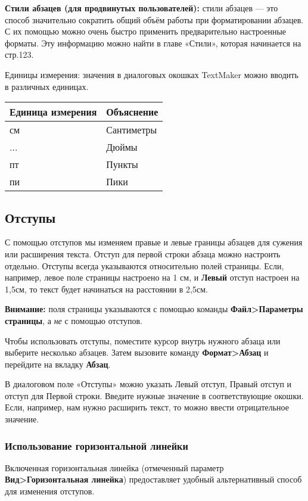 \documentclass[a4paper,10pt]{article}
\begin{document}
\textbf{Стили абзацев (для продвинутых пользователей):} стили абзацев --- это способ значительно сократить общий объём работы при форматировании абзацев. С их помощью можно очень быстро применить предварительно настроенные форматы. Эту информацию можно найти в главе «Стили», которая начинается на стр.123.

Единицы измерения: значения в диалоговых окошках TextMaker можно вводить в различных единицах.

\begin{center}
\begin{tabular}{ | m{4cm} | m{4cm} | }
\hline
 \textbf{Единица измерения} & \textbf{Объяснение} \\ 
 \hline
 см & Сантиметры\\
\hline
... & Дюймы\\
\hline
пт & Пункты \\
\hline
пи & Пики\\
\hline
\end{tabular}
\end{center}

\subsection{Отступы}
С помощью отступов мы изменяем правые и левые границы абзацев для сужения или расширения текста. Отступ для первой строки абзаца можно настроить отдельно.
Отступы всегда указываются относительно полей страницы. Если, например, левое поле страницы настроено на 1 см, и \textbf{Левый} отступ настроен на 1,5см, то текст будет начинаться на расстоянии в 2,5см.

\begin{mdframed}[backgroundcolor=blue!10]
\textbf{Внимание:} поля страницы указываются с помощью команды \textbf{Файл>Параметры страницы}, а \textit{не} с помощью отступов.
\end{mdframed}

Чтобы использовать отступы, поместите курсор внутрь нужного абзаца или выберите несколько абзацев. Затем вызовите команду \textbf{Формат>Абзац} и перейдите на вкладку \textbf{Абзац}.

В диалоговом поле «Отступы»  можно указать Левый отступ, Правый отступ и отступ для Первой строки. Введите нужные значение в соответствующие окошки.
Если, например, нам нужно расширить текст, то можно ввести отрицательное значение.

\subsubsection{Использование горизонтальной линейки}
Включенная горизонтальная линейка (отмеченный параметр \textbf{Вид>Горизонтальная линейка}) предоставляет удобный альтернативный способ для изменения отступов.
\end{document}
